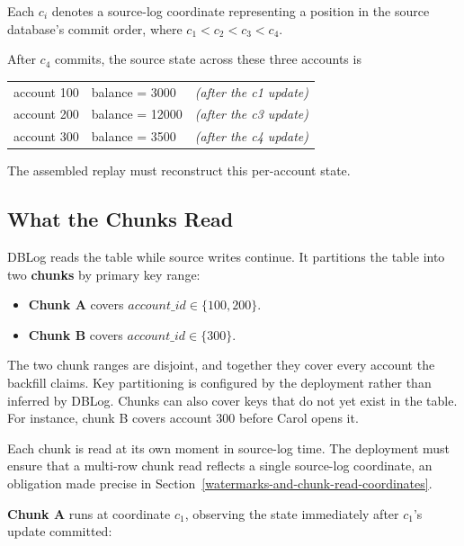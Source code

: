\documentclass[letterpaper,10pt,twocolumn]{article}
\providecommand{\tightlist}{\setlength{\itemsep}{0pt}\setlength{\parskip}{0pt}}
\begin{document}
Each $c_i$ denotes a source-log coordinate representing a position in
the source database's commit order, where $c_1 < c_2 < c_3 < c_4$.

After $c_4$ commits, the source state across these three accounts is

\begin{center}\footnotesize
\begin{tabular}{@{}l@{\hskip 1em}l@{\hskip 1em}l@{}}
\ttfamily account 100 & \ttfamily balance = \phantom{0}3000 & \itshape (after the c1 update)\\
\ttfamily account 200 & \ttfamily balance = 12000           & \itshape (after the c3 update)\\
\ttfamily account 300 & \ttfamily balance = \phantom{0}3500 & \itshape (after the c4 update)\\
\end{tabular}
\end{center}

The assembled replay must reconstruct this per-account state.

\subsection{What the Chunks Read}\label{what-the-chunks-read}

DBLog reads the table while source writes continue. It partitions the table
into two \textbf{chunks} by primary key range:

\begin{itemize}
\tightlist
\item
  \textbf{Chunk A} covers $\mathit{account\_id} \in \{100, 200\}$.
\item
  \textbf{Chunk B} covers $\mathit{account\_id} \in \{300\}$.
\end{itemize}

The two chunk ranges are disjoint, and together they cover every
account the backfill claims. Key partitioning is configured by the
deployment rather than inferred by DBLog. Chunks can also cover keys
that do not yet exist in the table. For instance, chunk B covers
account 300 before Carol opens it.

Each chunk is read at its own moment in source-log time. The
deployment must ensure that a multi-row chunk read reflects a single
source-log coordinate, an obligation made precise in
Section~\ref{watermarks-and-chunk-read-coordinates}.

\textbf{Chunk A} runs at coordinate $c_1$, observing
the state immediately after $c_1$'s update committed:
\end{document}
